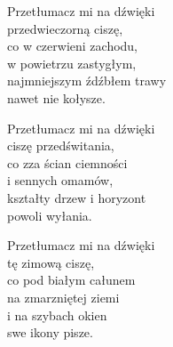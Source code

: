 \begin{text}
Przetłumacz mi na dźwięki\\
przedwieczorną ciszę,\\
co w czerwieni zachodu,\\
w powietrzu zastygłym,\\
najmniejszym źdźbłem trawy\\
nawet nie kołysze.

Przetłumacz mi na dźwięki\\
ciszę przedświtania,\\
co zza ścian ciemności\\
i sennych omamów,\\
kształty drzew i horyzont\\
powoli wyłania.

Przetłumacz mi na dźwięki\\
tę zimową ciszę,\\
co pod białym całunem\\
na zmarzniętej ziemi\\
i na szybach okien\\
swe ikony pisze.
\end{text}
\begin{chord}
\end{chord}